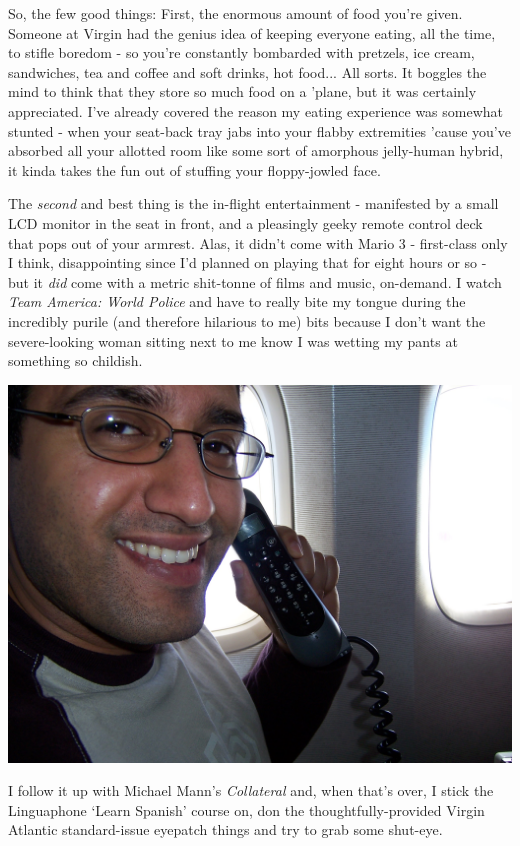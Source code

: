 \documentclass[a5paper,titlepage,11pt]{book}
\begin{document}
So, the few good things:  First, the enormous amount of food you're given.  Someone at Virgin had the genius idea of keeping everyone eating, all the time, to stifle boredom - so you're constantly bombarded with pretzels, ice cream, sandwiches, tea and coffee and soft drinks, hot food...  All sorts.  It boggles the mind to think that they store so much food on a 'plane, but it was certainly appreciated.  I've already covered the reason my eating experience was somewhat stunted - when your seat-back tray jabs into your flabby extremities 'cause you've absorbed all your allotted room like some sort of amorphous jelly-human hybrid, it kinda takes the fun out of stuffing your floppy-jowled face.

The \emph{second} and best thing is the in-flight entertainment - manifested by a small LCD monitor in the seat in front, and a pleasingly geeky remote control deck that pops out of your armrest.  Alas, it didn't come with Mario 3 - first-class only I think, disappointing since I'd planned on playing that for eight hours or so - but it \emph{did} come with a metric shit-tonne of films and music, on-demand.  I watch \emph{Team America: World Police} and have to really bite my tongue during the incredibly purile (and therefore hilarious to me) bits because I don't want the severe-looking woman sitting next to me know I was wetting my pants at something so childish.

\begin{center}\includegraphics[width=\textwidth]{gfx/100_0991}\end{center}

I follow it up with Michael Mann's \emph{Collateral} and, when that's over, I stick the Linguaphone `Learn Spanish' course on, don the thoughtfully-provided Virgin Atlantic standard-issue eyepatch things and try to grab some shut-eye.
\end{document}

